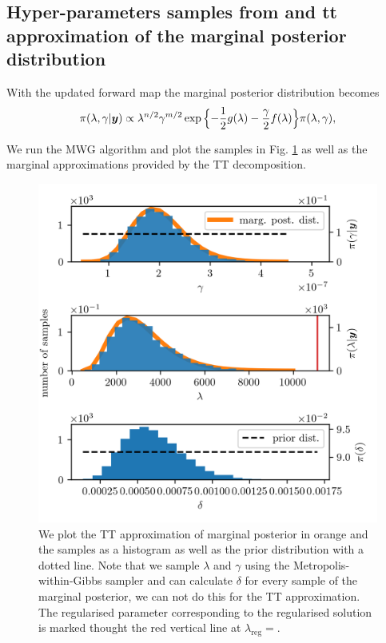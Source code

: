 \subsection{Hyper-parameters samples from and tt approximation of the marginal posterior distribution}
With the updated forward map the marginal posterior distribution becomes
\begin{align}
	\pi(\lambda, \gamma | \bm{y})
	\propto  \lambda^{n/2} \gamma^{m/2}   \exp{ \Bigl\{ - \frac{1}{2} g ( \lambda) - \frac{\gamma}{2} f ( \lambda) \Bigr\} } \pi(\lambda, \gamma),
	\label{eq:UpdMargPostAppl}
\end{align}


We run the MWG algorithm and plot the samples in Fig. \ref{fig:MargPostHistTT} as well as the marginal approximations provided by the TT decomposition.
\begin{figure}[ht!]
	\centering
	\includegraphics{secSIRTMargMargO3Res.png}
	\caption[Marginal posterior histograms and TT approximation as well as hyper-prior distribution.]{We plot the TT approximation of marginal posterior in orange and the samples as a histogram as well as the prior distribution with a dotted line. Note that we sample $\lambda$ and $\gamma$ using the Metropolis-within-Gibbs sampler and can calculate $\delta$ for every sample of the marginal posterior, we can not do this for the TT approximation. The regularised parameter corresponding to the regularised solution is marked thought the red vertical line at $\lambda_{\text{reg}} =$.}
	\label{fig:MargPostHistTT}
\end{figure}



